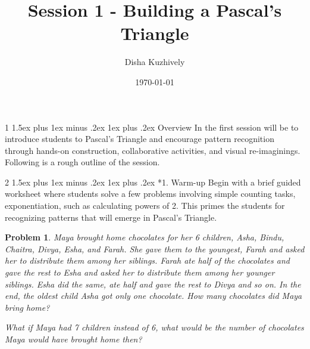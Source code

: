 \documentclass[a4paper,twoside,notitlepage,
11pt,
]{amsart}
\makeatletter
\newtheorem{xca}[theorem]{Problem}
\renewcommand{\section}{\@startsection
  {section}%
  {1}%
  {\z@}%
  {1.5ex plus 1ex minus .2ex}%
  {1ex plus .2ex}%
  {\normalfont\bfseries}}%
\renewcommand{\subsection}{\@startsection
    {subsection}%
    {2}%
    {\z@}%
    {1.5ex plus 1ex minus .2ex}%
    {1ex plus .2ex}%
    {\normalfont\itshape}}%
\makeatother
\begin{document}
\title[Pascal's Triangle]{Session 1 - Building a Pascal's Triangle}
\author{Disha Kuzhively}
\address{\textit{International Centre for Theoretical Sciences - TIFR, Bangalore}}
\date{\today}
\maketitle
\section{Overview}
In the first session will be to introduce students to Pascal's Triangle and encourage pattern recognition through hands-on construction, collaborative activities, and visual re-imaginings. Following is a rough outline of the session.
\subsection*{1. Warm-up}
Begin with a brief guided worksheet where students solve a few problems involving simple counting tasks, exponentiation, such as calculating powers of 2. This primes the students for recognizing patterns that will emerge in Pascal's Triangle.
\begin{xca}
  Maya brought home chocolates for her 6 children, Asha, Bindu, Chaitra, Divya, Esha, and Farah. She gave them to the youngest, Farah and asked her to distribute them among her siblings. Farah ate half of the chocolates and gave the rest to Esha and asked her to distribute them among her younger siblings. Esha did the same, ate half and gave the rest to Divya and so on. In the end, the oldest child Asha got only one chocolate. How many chocolates did Maya bring home?

  What if Maya had 7 children instead of 6, what would be the number of chocolates Maya would have brought home then?
\end{xca}
\end{document}
